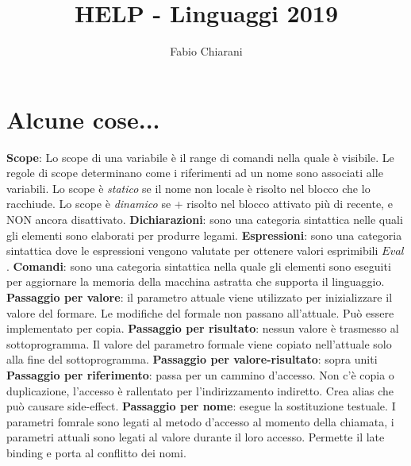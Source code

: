 \documentclass[a4paper]{article}
\begin{document}
\author{Fabio Chiarani}
\title{HELP - Linguaggi 2019}

\maketitle
\pagebreak

\section{Alcune cose...}
\textbf{Scope}: Lo scope di una variabile è il range di comandi nella quale è visibile. Le regole di scope determinano come i riferimenti ad un nome sono associati alle variabili.
\newline
Lo scope è \emph{statico} se il nome non locale è risolto nel blocco che lo racchiude.
\newline
Lo scope è \emph{dinamico} se + risolto nel blocco attivato più di recente, e NON ancora disattivato.
\newline
\newline
\textbf{Dichiarazioni}: sono una categoria sintattica nelle quali gli elementi sono elaborati per produrre legami.
\newline
\textbf{Espressioni}: sono una categoria sintattica dove le espressioni vengono valutate per ottenere valori esprimibili $Eval$.
\newline
\textbf{Comandi}: sono una categoria sintattica nella quale gli elementi sono eseguiti per aggiornare la memoria della macchina astratta che supporta il linguaggio.
\newline
\newline
\textbf{Passaggio per valore}: il parametro attuale viene utilizzato per inizializzare il valore del formare. Le modifiche del formale non passano all'attuale. Può essere implementato per copia.
\newline
\textbf{Passaggio per risultato}: nessun valore è trasmesso al sottoprogramma. Il valore del parametro formale viene copiato nell'attuale solo alla fine del sottoprogramma.
\newline
\textbf{Passaggio per valore-risultato}: sopra uniti
\newline
\textbf{Passaggio per riferimento}: passa per un cammino d'accesso. Non c'è copia o duplicazione, l'accesso è rallentato per l'indirizzamento indiretto. Crea alias che può causare side-effect.
\newline
\textbf{Passaggio per nome}: esegue la sostituzione testuale. I parametri fomrale sono legati al metodo d'accesso al momento della chiamata, i parametri attuali sono legati al valore durante il loro accesso. Permette il late binding e porta al conflitto dei nomi.
\end{document}

